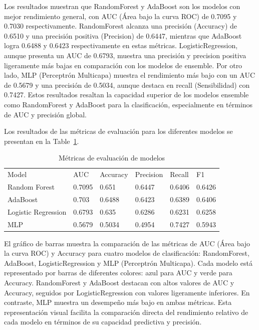 \documentclass[
  number,
  preprint,
  3p,
  twocolumn]{elsarticle}
\begin{document}
Los resultados muestran que RandomForest y AdaBoost son los modelos con
mejor rendimiento general, con AUC (Área bajo la curva ROC) de 0.7095 y
0.7030 respectivamente. RandomForest alcanza una precisión (Accuracy) de
0.6510 y una precisión positiva (Precision) de 0.6447, mientras que
AdaBoost logra 0.6488 y 0.6423 respectivamente en estas métricas.
LogisticRegression, aunque presenta un AUC de 0.6793, muestra una
precisión y precision positiva ligeramente más bajas en comparación con
los modelos de ensemble. Por otro lado, MLP (Perceptrón Multicapa)
muestra el rendimiento más bajo con un AUC de 0.5679 y una precisión de
0.5034, aunque destaca en recall (Sensibilidad) con 0.7427. Estos
resultados resaltan la capacidad superior de los modelos ensemble como
RandomForest y AdaBoost para la clasificación, especialmente en términos
de AUC y precisión global.

Los resultados de las métricas de evaluación para los diferentes modelos
se presentan en la Table~\ref{tbl-metricas}.

\begin{longtable}[]{@{}llllll@{}}

\caption{\label{tbl-metricas}Métricas de evaluación de modelos}

\tabularnewline

\toprule\noalign{}
\endhead
\bottomrule\noalign{}
\endlastfoot
Model & AUC & Accuracy & Precision & Recall & F1 \\
Random Forest & 0.7095 & 0.651 & 0.6447 & 0.6406 & 0.6426 \\
AdaBoost & 0.703 & 0.6488 & 0.6423 & 0.6389 & 0.6406 \\
Logistic Regression & 0.6793 & 0.635 & 0.6286 & 0.6231 & 0.6258 \\
MLP & 0.5679 & 0.5034 & 0.4954 & 0.7427 & 0.5943 \\

\end{longtable}

El gráfico de barras muestra la comparación de las métricas de AUC (Área
bajo la curva ROC) y Accuracy para cuatro modelos de clasificación:
RandomForest, AdaBoost, LogisticRegression y MLP (Perceptrón Multicapa).
Cada modelo está representado por barras de diferentes colores: azul
para AUC y verde para Accuracy. RandomForest y AdaBoost destacan con
altos valores de AUC y Accuracy, seguidos por LogisticRegression con
valores ligeramente inferiores. En contraste, MLP muestra un desempeño
más bajo en ambas métricas. Esta representación visual facilita la
comparación directa del rendimiento relativo de cada modelo en términos
de su capacidad predictiva y precisión.
\end{document}
